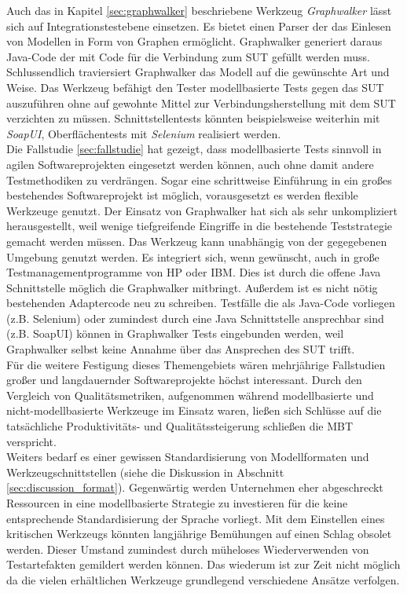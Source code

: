 Auch das in Kapitel \ref{sec:graphwalker} beschriebene Werkzeug \textit{Graphwalker} lässt sich auf Integrationstestebene einsetzen. Es bietet einen Parser der das Einlesen von Modellen in Form von Graphen ermöglicht. Graphwalker generiert daraus Java-Code der mit Code für die Verbindung zum \Gls{SUT} gefüllt werden muss. Schlussendlich traviersiert Graphwalker das Modell auf die gewünschte Art und Weise. Das Werkzeug befähigt den Tester modellbasierte Tests gegen das \Gls{SUT} auszuführen ohne auf gewohnte Mittel zur Verbindungsherstellung mit dem \Gls{SUT} verzichten zu müssen. Schnittstellentests könnten beispielsweise weiterhin mit \textit{SoapUI}, Oberflächentests mit \textit{Selenium} realisiert werden.\\
Die Fallstudie \ref{sec:fallstudie}  hat gezeigt, dass modellbasierte Tests sinnvoll in agilen Softwareprojekten eingesetzt werden können, auch ohne damit andere Testmethodiken zu verdrängen. Sogar eine schrittweise Einführung in ein großes bestehendes Softwareprojekt ist möglich, vorausgesetzt es werden flexible Werkzeuge genutzt. Der Einsatz von Graphwalker hat sich als sehr unkompliziert herausgestellt, weil wenige tiefgreifende Eingriffe in die bestehende Teststrategie gemacht werden müssen. Das Werkzeug kann unabhängig von der gegegebenen Umgebung genutzt werden. Es integriert sich, wenn gewünscht, auch in große Testmanagementprogramme von HP oder IBM. Dies ist durch die offene Java Schnittstelle möglich die Graphwalker mitbringt. Außerdem ist es nicht nötig bestehenden Adaptercode neu zu schreiben. Testfälle die als Java-Code vorliegen (z.B. Selenium) oder zumindest durch eine Java Schnittstelle ansprechbar sind (z.B. SoapUI) können in Graphwalker Tests eingebunden werden, weil Graphwalker selbst keine Annahme über das Ansprechen des \Gls{SUT} trifft.\\
Für die weitere Festigung dieses Themengebiets wären mehrjährige Fallstudien großer und langdauernder Softwareprojekte höchst interessant. Durch den Vergleich von Qualitätsmetriken, aufgenommen während modellbasierte und nicht-modellbasierte Werkzeuge im Einsatz waren, ließen sich Schlüsse auf die tatsächliche Produktivitäts- und Qualitätssteigerung schließen die \Gls{MBT} verspricht.\\
Weiters bedarf es einer gewissen Standardisierung von Modellformaten und Werkzeugschnittstellen (siehe die Diskussion in Abschnitt \ref{sec:discussion_format}). Gegenwärtig werden Unternehmen eher abgeschreckt Ressourcen in eine modellbasierte Strategie zu investieren für die keine entsprechende Standardisierung der Sprache vorliegt. Mit dem Einstellen eines kritischen Werkzeugs könnten langjährige Bemühungen auf einen Schlag obsolet werden. Dieser Umstand zumindest durch müheloses Wiederverwenden von Testartefakten gemildert werden können. Das wiederum ist zur Zeit nicht möglich da die vielen erhältlichen Werkzeuge grundlegend verschiedene Ansätze verfolgen.







